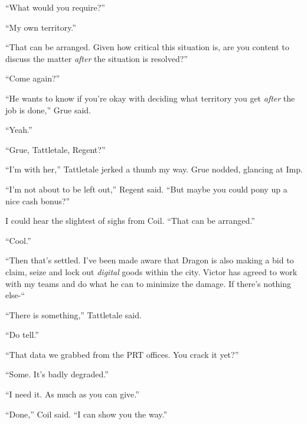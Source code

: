``What would you require?''



``My own territory.''



``That can be arranged.  Given how critical this situation is, are you content to discuss the matter \emph{after} the situation is resolved?''



``Come again?''



``He wants to know if you're okay with deciding what territory you get \emph{after} the job is done,'' Grue said.



``Yeah.''



``Grue, Tattletale, Regent?''



``I'm with her,'' Tattletale jerked a thumb my way.  Grue nodded, glancing at Imp.



``I'm not about to be left out,'' Regent said.  ``But maybe you could pony up a nice cash bonus?''



I could hear the slightest of sighs from Coil.  ``That can be arranged.''



``Cool.''



``Then that's settled.  I've been made aware that Dragon is also making a bid to claim, seize and lock out \emph{digital} goods within the city.  Victor has agreed to work with my teams and do what he can to minimize the damage.  If there's nothing else-``



``There is something,'' Tattletale said.



``Do tell.''



``That data we grabbed from the PRT offices.  You crack it yet?''



``Some.  It's badly degraded.''



``I need it.  As much as you can give.''



``Done,'' Coil said.  ``I can show you the way.''



